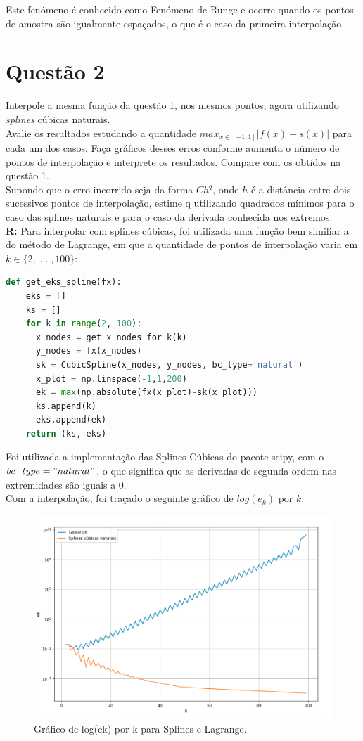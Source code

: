 \documentclass[12pt]{article}
\begin{document}
Este fenómeno é conhecido como Fenómeno de Runge e ocorre quando os pontos de amostra são igualmente espaçados, o que é o caso da primeira interpolação.


\section*{Questão 2}
Interpole a mesma função da questão 1, nos mesmos pontos, agora utilizando \emph{splines} cúbicas naturais. \\
Avalie os resultados estudando a quantidade $max_{x \in [-1, 1]}|f(x) - s(x)|$ para cada um dos casos. Faça gráficos desses erros conforme aumenta o número de pontos de interpolação e interprete os resultados. Compare com os obtidos na questão 1.\\[10pt]
Supondo que o erro incorrido seja da forma $Ch^q$, onde $h$ é a distância entre dois sucessivos pontos de interpolação, estime q utilizando quadrados mínimos para o caso das splines naturais e para o caso da derivada conhecida nos extremos. \\[10pt]

{\bfseries R:} Para interpolar com splines cúbicas, foi utilizada uma função bem similiar a do método de Lagrange, em que a quantidade de pontos de interpolação varia em $k \in \{2,\;...\;,100\}$:
\\
\begin{lstlisting}[language=Python]
  def get_eks_spline(fx):
    eks = []
    ks = []
    for k in range(2, 100):
      x_nodes = get_x_nodes_for_k(k)
      y_nodes = fx(x_nodes)
      sk = CubicSpline(x_nodes, y_nodes, bc_type='natural')
      x_plot = np.linspace(-1,1,200)
      ek = max(np.absolute(fx(x_plot)-sk(x_plot)))
      ks.append(k)
      eks.append(ek)
    return (ks, eks)
\end{lstlisting}
Foi utilizada a implementação das Splines Cúbicas do pacote scipy, com o $bc\_type = "natural"$, o que significa que as derivadas de segunda ordem nas extremidades são iguais a 0. \\
Com a interpolação, foi traçado o seguinte gráfico de $log(e_k)$ por $k$:

\begin{figure}[H]
  \begin{center}
    \includegraphics[width=0.8\linewidth]{splines_1.png}
  \end{center}
  \caption{Gráfico de log(ek) por k para Splines e Lagrange.}
  \label{fig:leastsquares1}
\end{figure}
\end{document}
